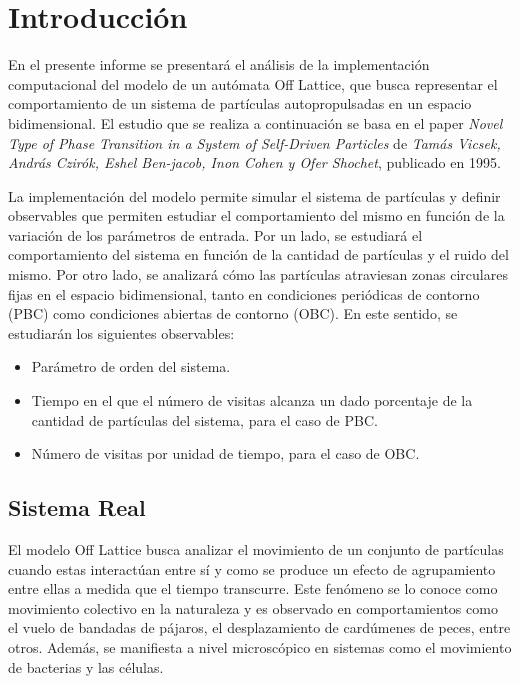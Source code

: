 \documentclass[11pt, a4paper]{article}
\begin{document}
    \tableofcontents
    \newpage

    \section{Introducción}
    \label{sec:introduccion}

        En el presente informe se presentará el análisis de la implementación computacional del modelo de un autómata
        Off Lattice, que busca representar el comportamiento de un sistema de partículas autopropulsadas en un espacio
        bidimensional.
        El estudio que se realiza a continuación se basa en el paper \textit{Novel Type of Phase Transition in a System
        of Self-Driven Particles} de \textit{Tamás Vicsek, András Czirók, Eshel Ben-jacob, Inon Cohen y Ofer Shochet},
        publicado en 1995.

        La implementación del modelo permite simular el sistema de partículas y definir observables que permiten
        estudiar el comportamiento del mismo en función de la variación de los parámetros de entrada.
        Por un lado, se estudiará el comportamiento del sistema en función de la cantidad de partículas y el ruido del
        mismo.
        Por otro lado, se analizará cómo las partículas atraviesan zonas circulares fijas en el espacio bidimensional,
        tanto en condiciones periódicas de contorno (PBC) como condiciones abiertas de contorno (OBC).
        En este sentido, se estudiarán los siguientes observables:

        \begin{itemize}
            \item Parámetro de orden del sistema.
            \item Tiempo en el que el número de visitas alcanza un dado porcentaje de la cantidad de partículas del sistema, para el caso de PBC\@.
            \item Número de visitas por unidad de tiempo, para el caso de OBC\@.
        \end{itemize}

        \subsection{Sistema Real}
        \label{subsec:sistema-real}

            El modelo Off Lattice busca analizar el movimiento de un conjunto de partículas cuando estas interactúan
            entre sí y como se produce un efecto de agrupamiento entre ellas a medida que el tiempo transcurre.
            Este fenómeno se lo conoce como movimiento colectivo en la naturaleza y es observado en comportamientos como
            el vuelo de bandadas de pájaros, el desplazamiento de cardúmenes de peces, entre otros.
            Además, se manifiesta a nivel microscópico en sistemas como el movimiento de bacterias y las células.
\end{document}
